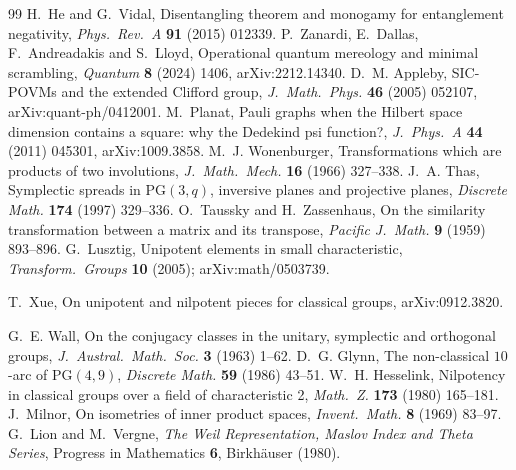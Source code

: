 \begin{thebibliography}{99}
 H.~He and G.~Vidal, Disentangling theorem and monogamy for entanglement negativity,
\emph{Phys.\ Rev.\ A} \textbf{91} (2015) 012339.
 P.~Zanardi, E.~Dallas, F.~Andreadakis and S.~Lloyd, Operational quantum mereology and
minimal scrambling, \emph{Quantum} \textbf{8} (2024) 1406, arXiv:2212.14340.
 D.~M. Appleby, SIC-POVMs and the extended Clifford group, \emph{J.\ Math.\ Phys.} \textbf{46}
(2005) 052107, arXiv:quant-ph/0412001.
 M.~Planat, Pauli graphs when the Hilbert space dimension contains a square: why the Dedekind psi
function?, \emph{J.\ Phys.\ A} \textbf{44} (2011) 045301, arXiv:1009.3858.
 M.~J. Wonenburger, Transformations which are products of two involutions,
\emph{J.\ Math.\ Mech.} \textbf{16} (1966) 327--338.
 J.~A. Thas, Symplectic spreads in $\mathrm{PG}(3,q)$, inversive planes and projective planes,
\emph{Discrete Math.} \textbf{174} (1997) 329--336.
 O.~Taussky and H.~Zassenhaus, On the similarity transformation between a matrix and
its transpose, \emph{Pacific J.\ Math.} \textbf{9} (1959) 893--896.
 G.~Lusztig, Unipotent elements in small characteristic, \emph{Transform.\ Groups}
\textbf{10} (2005); arXiv:math/0503739.

 T.~Xue, On unipotent and nilpotent pieces for classical groups, arXiv:0912.3820.

 G.~E. Wall, On the conjugacy classes in the unitary, symplectic and orthogonal groups,
\emph{J.\ Austral.\ Math.\ Soc.} \textbf{3} (1963) 1--62.
 D.~G. Glynn, The non-classical $10$-arc of $\mathrm{PG}(4,9)$, \emph{Discrete Math.} \textbf{59}
  (1986) 43--51.
 W.~H. Hesselink, Nilpotency in classical groups over a field of characteristic 2,
  \emph{Math.\ Z.} \textbf{173} (1980) 165--181.
 J.~Milnor, On isometries of inner product spaces, \emph{Invent.\ Math.} \textbf{8} (1969) 83--97.
 G.~Lion and M.~Vergne, \emph{The Weil Representation, Maslov Index and Theta Series},
Progress in Mathematics \textbf{6}, Birkh\"auser (1980).
\end{thebibliography}

